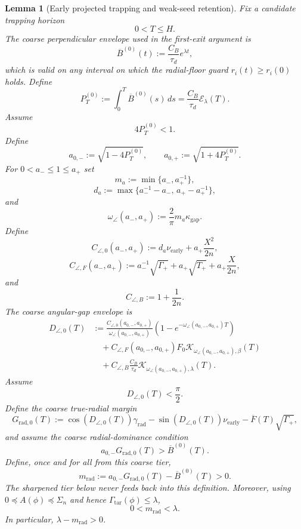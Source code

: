 \documentclass{article} %
\theoremstyle{plain}
\newtheorem{lemma}[theorem]{Lemma}
\theoremstyle{definition}
\theoremstyle{remark}
\begin{document}
\begin{lemma}[Early projected trapping and weak-seed retention]
Fix a candidate trapping horizon
\[
\boxed{0<T\le H.}
\]
The coarse perpendicular envelope used in the first-exit argument is
\[
\boxed{
\overline B^{(0)}(t)
:=
\frac{C_B}{\tau_d}e^{\lambda t},
}
\]
which is valid on any interval on which the radial-floor guard
$r_i(t)\ge r_i(0)$ holds.  Define
\[
\boxed{
P_T^{(0)}
:=
\int_0^T\overline B^{(0)}(s)\,ds
=
\frac{C_B}{\tau_d}\mathcal E_\lambda(T).
}
\]
Assume
\[
\boxed{
4P_T^{(0)}<1.
}
\]
Define
\[
a_{0,-}
:=
\sqrt{1-4P_T^{(0)}},
\qquad
 a_{0,+}
:=
\sqrt{1+4P_T^{(0)}}.
\]
For $0<a_-\le1\le a_+$ set
\[
m_a
:=
\min\{a_-,a_+^{-1}\},
\]
\[
d_a
:=
\max\{a_-^{-1}-a_-,\,a_+-a_+^{-1}\},
\]
and
\[
\omega_\angle(a_-,a_+)
:=
\frac2\pi m_a\kappa_{\mathrm{gap}}.
\]
Define
\[
C_{\angle,0}(a_-,a_+)
:=
d_a\nu_{\mathrm{early}}
+
a_+\frac{X^2}{2n},
\]
\[
C_{\angle,F}(a_-,a_+)
:=
a_-^{-1}\sqrt{\Gamma_+}
+
a_+\sqrt{T_+}
+
a_+\frac{X}{2n},
\]
and
\[
C_{\angle,B}:=1+\frac1{2n}.
\]
The coarse angular-gap envelope is
\[
\boxed{
\begin{aligned}
D_{\angle,0}(T)
&:=
\frac{
C_{\angle,0}(a_{0,-},a_{0,+})
}{
\omega_\angle(a_{0,-},a_{0,+})
}
\left(
1-e^{-\omega_\angle(a_{0,-},a_{0,+})T}
\right)
\\
&\quad+
C_{\angle,F}(a_{0,-},a_{0,+})
F_0
\mathcal K_{\omega_\angle(a_{0,-},a_{0,+}),\beta}(T)
\\
&\quad+
C_{\angle,B}
\frac{C_B}{\tau_d}
\mathcal K_{\omega_\angle(a_{0,-},a_{0,+}),\lambda}(T).
\end{aligned}
}
\]
Assume
\[
\boxed{
D_{\angle,0}(T)<\frac\pi2.
}
\]
Define the coarse true-radial margin
\[
\boxed{
G_{\mathrm{rad},0}(T)
:=
\cos(D_{\angle,0}(T))\gamma_{\mathrm{rad}}
-
\sin(D_{\angle,0}(T))\nu_{\mathrm{early}}
-
\overline F(T)\sqrt{\Gamma_+},
}
\]
and assume the coarse radial-dominance condition
\[
\boxed{
a_{0,-}G_{\mathrm{rad},0}(T)
>
\overline B^{(0)}(T).
}
\]
Define, once and for all from this coarse tier,
\[
\boxed{
m_{\mathrm{rad}}
:=
a_{0,-}G_{\mathrm{rad},0}(T)
-
\overline B^{(0)}(T)
>
0.
}
\]
The sharpened tier below never feeds back into this definition.  Moreover,
using $0\preceq A(\phi)\preceq\Sigma_n$ and hence
$\Gamma_{\mathrm{tar}}(\phi)\le\lambda$,
\[
\boxed{
0<m_{\mathrm{rad}}<\lambda.
}
\]
In particular, $\lambda-m_{\mathrm{rad}}>0$.


\end{lemma}
\end{document}
